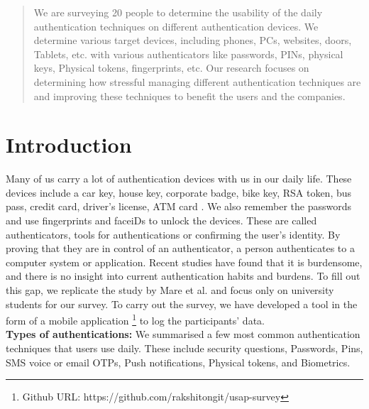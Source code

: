 \maketitle
\thecopyright

\begin{abstract}
We are surveying 20 people to determine the usability of the daily authentication techniques on different authentication devices. We determine various target devices, including phones, PCs, websites, doors, Tablets, etc. with various authenticators like passwords, PINs, physical keys, Physical tokens, fingerprints, etc. Our research focuses on determining how stressful managing different authentication techniques are and improving these techniques to benefit the users and the companies.
\end{abstract}


\section{Introduction}
Many of us carry a lot of authentication devices with us in our daily life. These devices include a car key, house key, corporate badge, bike key, RSA token, bus pass, credit card, driver's license, ATM card \cite{197318}. We also remember the passwords and use fingerprints and faceiDs to unlock the devices. These are called authenticators, tools for authentications or confirming the user's identity. By proving that they are in control of an authenticator, a person authenticates to a computer system or application. Recent studies have found that it is burdensome, and there is no insight into current authentication habits and burdens. To fill out this gap, we replicate the study by Mare et al. \cite{197318} and focus only on university students for our survey. To carry out the survey, we have developed a tool in the form of a mobile application%
\footnote{Github URL: https://github.com/rakshitongit/usap-survey} to log the participants' data. \\
\textbf{Types of authentications:} We summarised a few most common authentication techniques that users use daily. These include security questions, Passwords, Pins, SMS voice or email OTPs, Push notifications, Physical tokens, and Biometrics.

